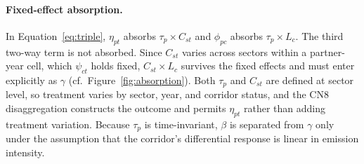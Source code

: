 \paragraph{Fixed-effect absorption.}
In Equation~\ref{eq:triple}, $\eta_{pt}$ absorbs $\tau_p \times C_{st}$ and $\phi_{pc}$ absorbs $\tau_p \times L_c$. The third two-way term is not absorbed. Since $C_{st}$ varies across sectors within a partner-year cell, which $\psi_{ct}$ holds fixed, $C_{st} \times L_c$ survives the fixed effects and must enter explicitly as $\gamma$ (cf.\ Figure~\ref{fig:absorption}). Both $\tau_p$ and $C_{st}$ are defined at sector level, so treatment varies by sector, year, and corridor status, and the CN8 disaggregation constructs the outcome and permits $\eta_{pt}$ rather than adding treatment variation. Because $\tau_p$ is time-invariant, $\beta$ is separated from $\gamma$ only under the assumption that the corridor's differential response is linear in emission intensity.

